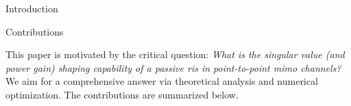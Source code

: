 \documentclass[journal]{IEEEtran}
\begin{document}
\begin{section}{Introduction}
\begin{subsection}{Contributions}


		This paper is motivated by the critical question:
		\emph{What is the singular value (and power gain) shaping capability of a passive \gls{ris} in point-to-point \gls{mimo} channels?}
		We aim for a comprehensive answer via theoretical analysis and numerical optimization.
		The contributions are summarized below.





\end{subsection}
\end{section}
\end{document}

